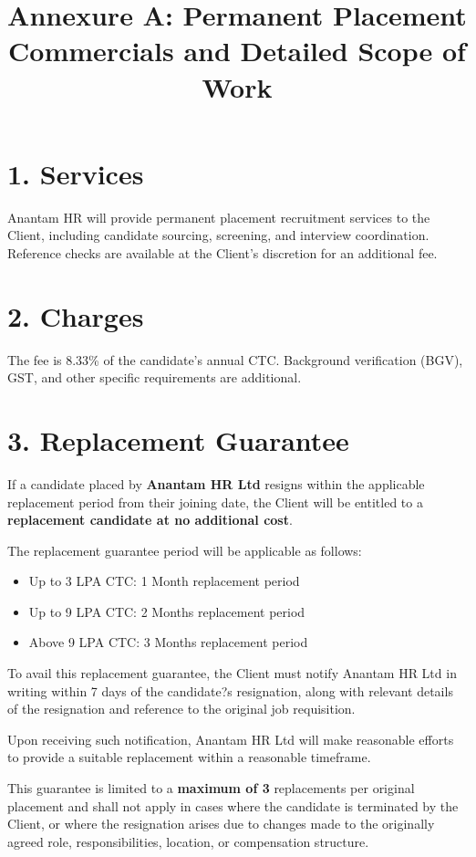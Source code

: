 \documentclass{article}
\title{Annexure A: Permanent Placement Commercials and Detailed Scope of Work}
\date{}
\begin{document}
\maketitle

\section*{1. Services}
Anantam HR will provide permanent placement recruitment services to the Client, including candidate sourcing, screening, and interview coordination. Reference checks are available at the Client's discretion for an additional fee.

\section*{2. Charges}
The fee is 8.33\% of the candidate's annual CTC. Background verification (BGV), GST, and other specific requirements are additional.

\section*{3. Replacement Guarantee}

If a candidate placed by \textbf{Anantam HR Ltd} resigns within the applicable replacement period from their joining date, the Client will be entitled to a \textbf{replacement candidate at no additional cost}.

The replacement guarantee period will be applicable as follows:

\begin{itemize}
\item Up to 3 LPA CTC: 1 Month replacement period
\item Up to 9 LPA CTC: 2 Months replacement period
\item Above 9 LPA CTC: 3 Months replacement period
\end{itemize}

To avail this replacement guarantee, the Client must notify Anantam HR Ltd in writing within 7 days of the candidate?s resignation, along with relevant details of the resignation and reference to the original job requisition.

Upon receiving such notification, Anantam HR Ltd will make reasonable efforts to provide a suitable replacement within a reasonable timeframe.

This guarantee is limited to a \textbf{maximum of 3} replacements per original placement and shall not apply in cases where the candidate is terminated by the Client, or where the resignation arises due to changes made to the originally agreed role, responsibilities, location, or compensation structure.
\end{document}
